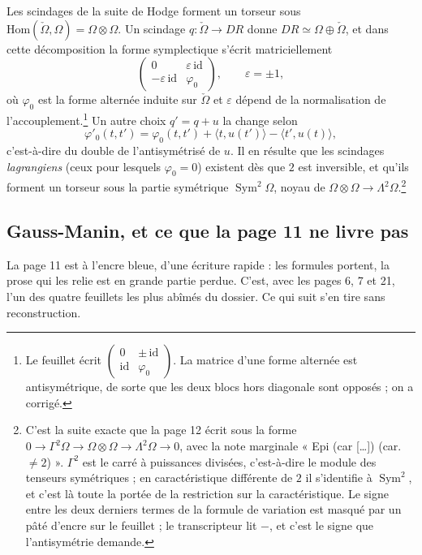 \documentclass[11pt,a4paper]{article}
\begin{document}
Les scindages de la suite de Hodge forment un torseur sous
$\mathrm{Hom}(\check{\Omega}, \Omega) = \Omega \otimes \Omega$. Un scindage
$q : \check{\Omega} \to DR$ donne $DR \simeq \Omega \oplus \check{\Omega}$, et
dans cette décomposition la forme symplectique s'écrit matriciellement
\[
  \begin{pmatrix} 0 & \varepsilon\,\mathrm{id} \\ -\varepsilon\,\mathrm{id} & \varphi_0 \end{pmatrix},
  \qquad \varepsilon = \pm 1,
\]
où $\varphi_0$ est la forme alternée induite sur $\check{\Omega}$ et
$\varepsilon$ dépend de la normalisation de l'accouplement.\footnote{Le
feuillet écrit $\begin{pmatrix} 0 & \pm\,\mathrm{id} \\ \mathrm{id} &
\varphi_0 \end{pmatrix}$. La matrice d'une forme alternée est antisymétrique,
de sorte que les deux blocs hors diagonale sont opposés ; on a corrigé.} Un autre
choix $q' = q + u$ la change selon
\[
  \varphi'_0(t,t') = \varphi_0(t,t') + \langle t, u(t')\rangle
  - \langle t', u(t)\rangle ,
\]
c'est-à-dire du double de l'antisymétrisé de $u$. Il en résulte que les
scindages \emph{lagrangiens} (ceux pour lesquels $\varphi_0 = 0$) existent
dès que $2$ est inversible, et qu'ils forment un torseur sous la partie
symétrique $\operatorname{Sym}^2 \Omega$, noyau de
$\Omega \otimes \Omega \to \Lambda^2 \Omega$.\footnote{C'est la suite exacte
que la page 12 écrit sous la forme
$0 \to \Gamma^2\Omega \to \Omega\otimes\Omega \to \Lambda^2\Omega \to 0$, avec
la note marginale « Epi (car [\ldots]) (car. $\neq 2$) ». $\Gamma^2$ est le carré à
puissances divisées, c'est-à-dire le module des tenseurs symétriques ; en
caractéristique différente de $2$ il s'identifie à $\operatorname{Sym}^2$, et
c'est là toute la portée de la restriction sur la caractéristique. Le signe
entre les deux derniers termes de la formule de variation est masqué par un
pâté d'encre sur le feuillet ; le transcripteur lit $-$, et c'est le signe que
l'antisymétrie demande.}

\subsection*{Gauss-Manin, et ce que la page 11 ne livre pas}

La page 11 est à l'encre bleue, d'une écriture rapide : les formules portent,
la prose qui les relie est en grande partie perdue. C'est, avec les pages 6, 7
et 21, l'un des quatre feuillets les plus abîmés du dossier. Ce qui suit s'en
tire sans reconstruction.
\end{document}
